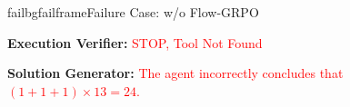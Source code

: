 \begin{small}
\begin{center}
\begin{casebox}{failbg}{failframe}{Failure Case: \model w/o Flow-GRPO}
    \vspace{1em}

    
    \textbf{Execution Verifier:} \textcolor{red}{STOP, Tool Not Found}
    
    \vspace{1em}

    
    \textbf{Solution Generator: } \textcolor{red}{The agent incorrectly concludes that $(1 + 1 + 1) \times 13 = 24$.}
    
\end{casebox}

\end{center}
\end{small}
